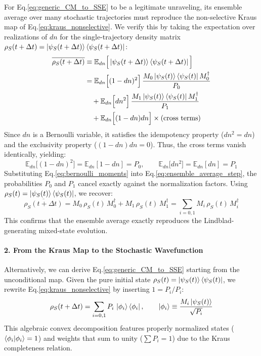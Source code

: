 \documentclass[a4paper,12pt]{article}
\begin{document}
For Eq.\ref{eq:generic_CM_to_SSE} to be a legitimate unraveling, its ensemble average over many stochastic trajectories must reproduce the non-selective Kraus map of Eq.\ref{eq:kraus_nonselective}. We verify this by taking the expectation over realizations of $dn$ for the single-trajectory density matrix $\rho_{S}(t+\Delta t) = \ket{\psi_{S}(t+\Delta t)}\bra{\psi_{S}(t+\Delta t)}$:
\begin{align}
	\overline{\rho_{S}(t+\Delta t)} 
	&\equiv \mathbb{E}_{dn}\Big[ \ket{\psi_{S}(t+\Delta t)} \bra{\psi_{S}(t+\Delta t)} \Big] \notag \\
	&= \mathbb{E}_{dn}\Big[ (1-dn)^{2} \Big] \, \frac{M_{0}\ket{\psi_{S}(t)}\bra{\psi_{S}(t)}M_{0}^{\dagger}}{P_{0}} \notag \\
	&\quad + \mathbb{E}_{dn}\Big[ dn^{2} \Big] \, \frac{M_{1}\ket{\psi_{S}(t)}\bra{\psi_{S}(t)}M_{1}^{\dagger}}{P_{1}} \notag \\
	&\quad + \mathbb{E}_{dn}\Big[ (1-dn)dn \Big] \times (\text{cross terms})
	\label{eq:ensemble_average_step}
\end{align}
Since $dn$ is a Bernoulli variable, it satisfies the idempotency property ($dn^{2}=dn$) and the exclusivity property ($(1-dn)dn = 0$). Thus, the cross terms vanish identically, yielding:
\begin{equation}
	\mathbb{E}_{dn}\big[(1-dn)^{2}\big] = \mathbb{E}_{dn}[1-dn] = P_{0}, 
	\qquad 
	\mathbb{E}_{dn}\big[dn^{2}\big] = \mathbb{E}_{dn}[dn] = P_{1}
	\label{eq:bernoulli_moments}
\end{equation}
Substituting Eq.\ref{eq:bernoulli_moments} into Eq.\ref{eq:ensemble_average_step}, the probabilities $P_{0}$ and $P_{1}$ cancel exactly against the normalization factors. Using $\rho_{S}(t) = \ket{\psi_{S}(t)}\bra{\psi_{S}(t)}$, we recover:
\begin{equation}
	\overline{\rho_{S}(t+\Delta t)} 
	= M_{0} \, \rho_{S}(t) \, M_{0}^{\dagger} + M_{1} \, \rho_{S}(t) \, M_{1}^{\dagger}
	= \sum_{i=0,1} M_{i}\, \rho_{S}(t)\, M_{i}^{\dagger}
	\label{eq:ensemble_recovers_kraus}
\end{equation}
This confirms that the ensemble average exactly reproduces the Lindblad-generating mixed-state evolution.

\paragraph{2. From the Kraus Map to the Stochastic Wavefunction}
Alternatively, we can derive Eq.\ref{eq:generic_CM_to_SSE} starting from the unconditional map. Given the pure initial state $\rho_{S}(t) = \ket{\psi_{S}(t)}\bra{\psi_{S}(t)}$, we rewrite Eq.\ref{eq:kraus_nonselective} by inserting $1 = P_{i}/P_{i}$:
\begin{equation}
	\rho_{S}(t+\Delta t) = \sum_{i=0,1} P_{i} \, \ket{\phi_{i}}\bra{\phi_{i}}, 
	\qquad 
	\ket{\phi_{i}} \equiv \frac{M_{i}\ket{\psi_{S}(t)}}{\sqrt{P_{i}}}
	\label{eq:convex_decomposition}
\end{equation}
This algebraic convex decomposition features properly normalized states ($\braket{\phi_{i}|\phi_{i}} = 1$) and weights that sum to unity ($\sum P_{i} = 1$) due to the Kraus completeness relation.
\end{document}
